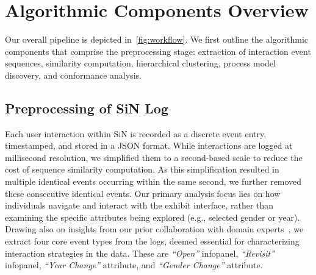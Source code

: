 \documentclass[preprint,journal]{vgtc}            %
\begin{document}
\section{Algorithmic Components Overview}
Our overall pipeline is depicted in~\cref{fig:workflow}.
We first outline the algorithmic components that comprise the preprocessing stage: extraction of interaction event sequences, similarity computation, hierarchical clustering, process model discovery, and conformance analysis.





\subsection{Preprocessing of SiN Log}
\label{preprocessing}

Each user interaction within SiN is recorded as a discrete event entry, timestamped, and stored in a JSON format. 
While interactions are logged at millisecond resolution, we simplified them to a second-based scale to reduce the cost of sequence similarity computation.
As this simplification resulted in multiple identical events occurring within the same second, we further removed these consecutive identical events.
Our primary analysis focus lies on how individuals navigate and interact with the exhibit interface, rather than examining the specific attributes being explored (e.g., selected gender or year).
Drawing also on insights from our prior collaboration with domain experts~\cite{Yu25Revealing}, we extract four core event types from the logs, deemed essential for characterizing interaction strategies in the data.
These are \textit{``Open''} infopanel, \textit{``Revisit''} infopanel, \textit{``Year Change''} attribute, and \textit{``Gender Change''} attribute.
\end{document}
